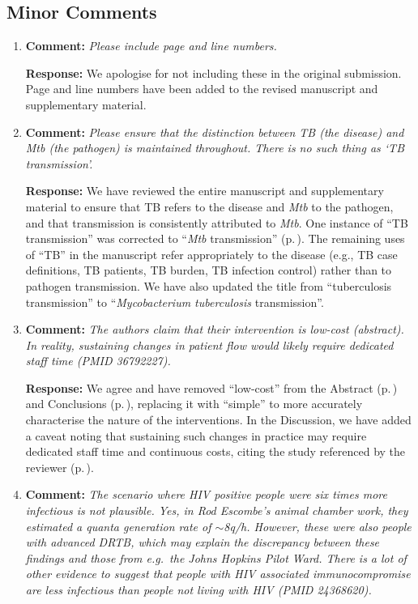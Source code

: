 \documentclass[11pt]{article}
\newcommand{\comment}[1]{\textbf{Comment:} \textit{#1}}
\newcommand{\response}[1]{\textbf{Response:} #1}
\begin{document}
\subsection*{Minor Comments}

\begin{enumerate}[label=\textbf{R2.\arabic*.}, leftmargin=*, start=28]

\item\label{r:2.28} \comment{Please include page and line numbers.}

\response{We apologise for not including these in the original submission. Page and line numbers have been added to the revised manuscript and supplementary material.}

\item\label{r:2.29} \comment{Please ensure that the distinction between TB (the disease) and Mtb (the pathogen) is maintained throughout. There is no such thing as `TB transmission'.}

\response{We have reviewed the entire manuscript and supplementary material to ensure that TB refers to the disease and \emph{Mtb} to the pathogen, and that transmission is consistently attributed to \emph{Mtb}. One instance of ``TB transmission'' was corrected to ``\emph{Mtb} transmission'' (p.\,\pageref{chg:R2.29}). The remaining uses of ``TB'' in the manuscript refer appropriately to the disease (e.g., TB case definitions, TB patients, TB burden, TB infection control) rather than to pathogen transmission. We have also updated the title from ``tuberculosis transmission'' to ``\emph{Mycobacterium tuberculosis} transmission''.}

\item\label{r:2.30} \comment{The authors claim that their intervention is low-cost (abstract). In reality, sustaining changes in patient flow would likely require dedicated staff time (PMID 36792227).}

\response{We agree and have removed ``low-cost'' from the Abstract (p.\,\pageref{chg:R2.30abs}) and Conclusions (p.\,\pageref{chg:R2.30conc}), replacing it with ``simple'' to more accurately characterise the nature of the interventions. In the Discussion, we have added a caveat noting that sustaining such changes in practice may require dedicated staff time and continuous costs, citing the study referenced by the reviewer (p.\,\pageref{chg:R2.30disc}).}

\item\label{r:2.31} \comment{The scenario where HIV positive people were six times more infectious is not plausible. Yes, in Rod Escombe's animal chamber work, they estimated a quanta generation rate of $\sim$8q/h. However, these were also people with advanced DRTB, which may explain the discrepancy between these findings and those from e.g.\ the Johns Hopkins Pilot Ward. There is a lot of other evidence to suggest that people with HIV associated immunocompromise are less infectious than people not living with HIV (PMID 24368620).}


\end{enumerate}
\end{document}
